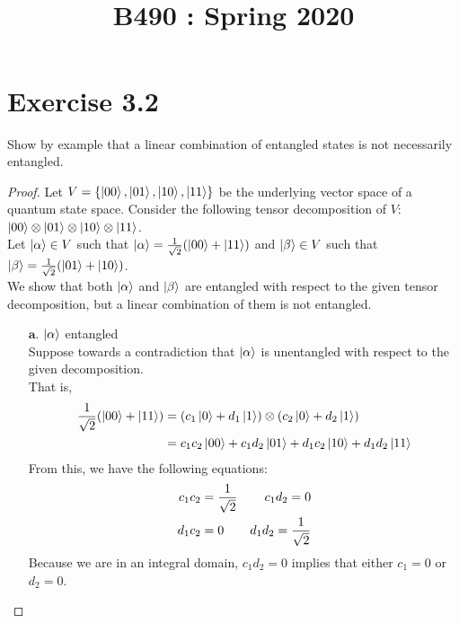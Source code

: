 \documentclass[11pt]{article}
\title{
    \vspace{2in}
    \textmd{\textbf{\tit}}\\
    \normalsize\vspace{0.1in}\small{B490 : Spring 2020 }\\
    \vspace{0.1in}\large{\textit{\auths}}
    \vspace{3in}
}
\date{}
\def\aket{\ket{\alpha}}
\def\srtt{\ensuremath\frac{1}{\sqrt{2}}}
\begin{document}
\maketitle
\pagebreak


\section*{Exercise 3.2}

Show by example that a linear combination of entangled states is 
not necessarily entangled.

\begin{proof}
    Let $V = \{\ket{00},\ket{01},\ket{10},\ket{11}\}$ be the underlying vector space of a quantum state space. 
    Consider the following tensor decomposition of $V$: $\ket{00}  \otimes \ket{01} \otimes \ket{10} \otimes \ket{11}$.\\
    Let $\ket{\alpha} \in V$ such that $\ket{\alpha} = \srtt(\ket{00} + \ket{11})$
    and $\ket{\beta} \in V$ such that $\ket{\beta} = \srtt(\ket{01} + \ket{10})$.  \\
    We show that both $\ket{\alpha}$ and $\ket{\beta}$ are entangled with respect to the given tensor decomposition,
    but a linear combination of them is not entangled.
    \begin{enumerate}
        \item[$\textbf{a.}$] $\ket{\alpha}$ entangled \\
            Suppose towards a contradiction that $\aket$ is unentangled with respect to the given decomposition. \\
            That is, 
            \begin{align*}
                \srtt(\ket{00} + \ket{11}) 
                &= (c_1\ket{0} + d_1\ket{1}) \otimes (c_2\ket{0} + d_2\ket{1}) \\
                &= c_1c_2\ket{00} + c_1d_2\ket{01} + d_1c_2\ket{10} + d_1d_2\ket{11} 
            \end{align*} 
        From this, we have the following equations: 
            \begin{align*}
                c_1c_2 &= \srtt & c_1d_2 = 0 \\
                d_1c_2 &= 0  & d_1d_2 = \srtt 
            \end{align*} 
            Because we are in an integral domain, $c_1d_2 = 0$ implies that either $c_1 = 0$ or $d_2 = 0$.

\end{enumerate}
\end{proof}
\end{document}
